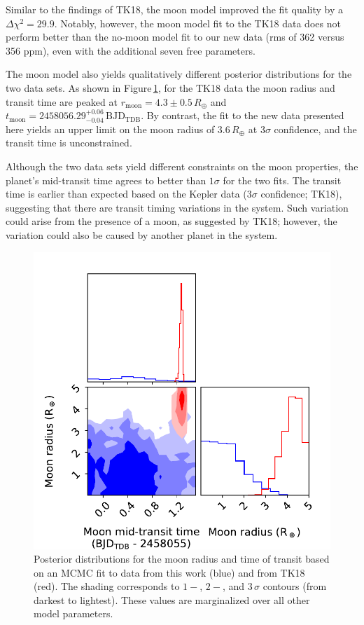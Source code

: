 \documentclass[twocolumn,trackchanges]{aastex62}
\begin{document}
Similar to the findings of TK18, the moon model improved the fit quality by a $\Delta\chi^2 = 29.9$. Notably, however, the moon model fit to the TK18 data does not perform better than the no-moon model fit to our new data (rms of 362 versus 356 ppm), even with the additional seven free parameters.  

The moon model also yields qualitatively different posterior distributions for the two data sets.  As shown in Figure\,\ref{fig:corner}, for the TK18 data the moon radius and transit time are peaked at $r_\mathrm{moon} = 4.3\pm0.5\,R_\oplus$  and $t_\mathrm{moon} =  2458056.29^{+0.06}_{-0.04}\,\mathrm{BJD_{TDB}}$. By contrast, the fit to the new data presented here yields an upper limit on the moon radius of $3.6\,R_\oplus$ at $3\sigma$ confidence, and the transit time is unconstrained.

Although the two data sets yield different constraints on the moon properties, the planet's mid-transit time agrees to better than $1\sigma$ for the two fits. The transit time is earlier than expected based on the Kepler data ($3\sigma$ confidence; TK18), suggesting that there are transit timing variations in the system. Such variation could arise from the presence of a moon, as suggested by TK18; however, the variation could also be caused by another planet in the system.


\begin{figure}
\includegraphics[width = 0.5 \textwidth]{fig5_pairs.pdf}
    \caption{Posterior distributions for the moon radius and time of transit based on an MCMC fit to data from this work (blue) and from TK18 (red). The shading corresponds to $1-$, $2-$, and $3\,\sigma$ contours (from darkest to lightest). These values are marginalized over all other model parameters.} 
\label{fig:corner}
\end{figure}
\end{document}
